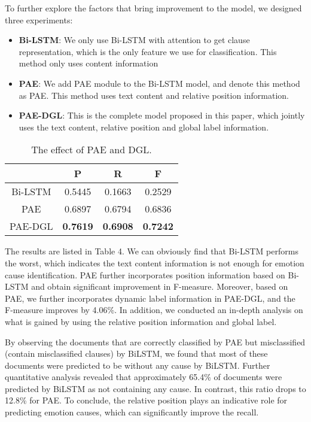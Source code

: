 \documentclass[letterpaper]{article} \usepackage{aaai19}  \usepackage{times}  \usepackage{helvet}  \usepackage{courier}  \usepackage{url}  \usepackage{graphicx}  \frenchspacing  \setlength{\pdfpagewidth}{8.5in}  \setlength{\pdfpageheight}{11in}  \setcounter{secnumdepth}{0}
\begin{document}
To further explore the factors that bring improvement to the model, we designed three experiments:

\begin{itemize}
	\item \textbf{Bi-LSTM}: We only use Bi-LSTM with attention to get clause representation, which is the only feature we use for classification. This method only uses content information
	\item \textbf{PAE}: We add PAE module to the Bi-LSTM model, and denote this method as PAE. This method uses text content and relative position information.
	\item \textbf{PAE-DGL}: This is the complete model proposed in this paper, which jointly uses the text content, relative position and global label information.
\end{itemize}

\begin{table}
	
	\centering
	\caption{\label{font-table} The effect of PAE and DGL. }
	\begin{tabular} {c|c|c|c}
		\hline    & P & R & F\\
		\hline
		Bi-LSTM & 0.5445 & 0.1663 & 0.2529 \\
		PAE & 0.6897 & 0.6794 & 0.6836 \\
		PAE-DGL & \textbf{0.7619} & \textbf{0.6908} & \textbf{0.7242} \\
		\hline
	\end{tabular}
	\label{tab:table1}
\end{table}

The results are listed in Table 4. We can obviously find that Bi-LSTM performs the worst, which indicates the text content information is not enough for emotion cause identification. PAE further incorporates position information based on Bi-LSTM and obtain significant improvement in F-measure. Moreover, based on PAE, we further incorporates dynamic label information in PAE-DGL, and the F-measure improves by 4.06\%. In addition, we conducted an in-depth analysis on what is gained by using the relative position information and global label.

By observing the documents that are correctly classified by PAE but misclassified (contain misclassified clauses) by BiLSTM, we found that most of these documents were predicted to be without any cause by BiLSTM. Further quantitative analysis revealed that approximately 65.4\% of documents were predicted by BiLSTM as not containing any cause. In contrast, this ratio drops to 12.8\% for PAE. To conclude, the relative position plays an indicative role for predicting emotion causes, which can significantly improve the recall.
\end{document}
